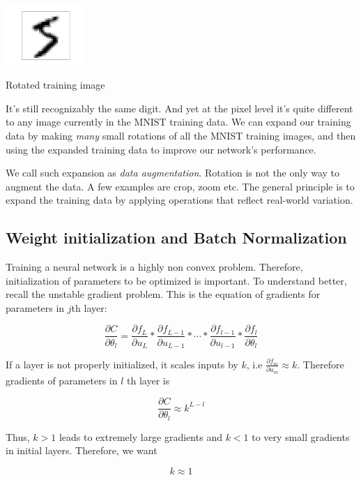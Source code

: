 \documentclass[a4paper]{tufte-handout}
\begin{document}
\begin{marginfigure}
  \includegraphics[width=30mm]{more_data_rotated_5.png}
  \caption{Rotated training image}
  \label{fig:mnist2}
\end{marginfigure}


It's still recognizably the same digit. And yet at the pixel level it's
quite different to any image currently in the MNIST training data. We
can expand our training data by making \emph{many} small rotations of
all the MNIST training images, and then using the expanded training data
to improve our network's performance.

We call such expansion as \emph{data augmentation}. Rotation is not the
only way to augment the data. A few examples are crop, zoom etc. The
general principle is to expand the training data by applying operations
that reflect real-world variation.

\subsection{Weight initialization and Batch
Normalization}\label{weight-initialization-and-batch-normalization}

Training a neural network is a highly non convex problem. Therefore,
initialization of parameters to be optimized is important. To understand
better, recall the unstable gradient problem. This is the equation of
gradients for parameters in \(j\)th layer:

\[\frac{\partial C}{\partial \theta_l} = \frac{\partial f_L}{\partial u_L} * \frac{\partial f_{L-1}}{\partial u_{L-1}} * \cdots * \frac{\partial f_{l-1}}{\partial u_{l-1}} * \frac{\partial f_l}{\partial \theta_l}\]

If a layer is not properly initialized, it scales inputs by \(k\), i.e
\(\frac{\partial f_m}{\partial u_m} \approx k\). Therefore gradients of
parameters in \(l\) th layer is

\[\frac{\partial C}{\partial \theta_l} \approx k^{L - l}\]

Thus, \(k > 1\) leads to extremely large gradients and \(k<1\) to very
small gradients in initial layers. Therefore, we want

\[k \approx 1\]
\end{document}
